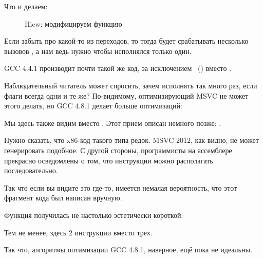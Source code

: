\clearpage
Что и делаем:

\begin{figure}[H]
\centering
{}
\caption{Hiew: модифицируем функцию }
\label{fig:jcc_hiew_2}
\end{figure}

Если забыть про какой-то из переходов, то тогда будет срабатывать несколько вызовов \printf, 
а нам ведь нужно чтобы исполнялся только один.


\NonOptimizing GCC 4.4.1 производит почти такой же код, за исключением \puts~() вместо \printf.


Наблюдательный читатель может спросить, зачем исполнять \CMP так много раз,
если флаги всегда одни и те же?
По-видимому, оптимизирующий MSVC не может этого делать, но GCC 4.8.1 делает больше оптимизаций:



Мы здесь также видим  вместо .
Этот прием описан немного позже: .

Нужно сказать, что x86-код такого типа редок.
MSVC 2012, как видно, не может генерировать подобное.
С другой стороны, программисты на ассемблере прекрасно осведомлены о том,
что инструкции  можно располагать последовательно.

Так что если вы видите это где-то, имеется немалая вероятность, что этот фрагмент кода был написан вручную.

Функция  получилась не настолько эстетически короткой:



Тем не менее, здесь 2 инструкции  вместо трех.

Так что, алгоритмы оптимизации GCC 4.8.1, наверное, ещё пока не идеальны.
